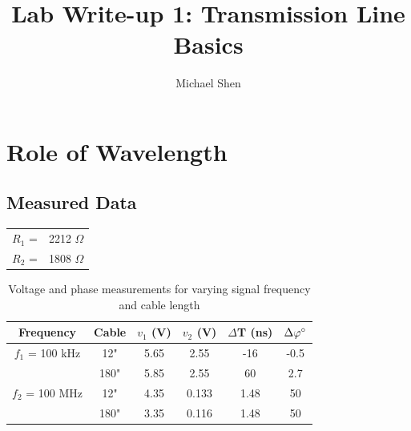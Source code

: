 \documentclass{article}
\begin{document}
\title{Lab Write-up 1: Transmission Line Basics}
\author{Michael Shen}
\maketitle

\section{Role of Wavelength}
\subsection{Measured Data}
\begin{table}[h]
	\begin{tabular}{rl}
	$R_{1}$ =  & 2212 $\Omega$  \\
	$R_{2}$ =  & 1808 $\Omega$      
	\end{tabular}
\end{table}

\begin{table}[H]
\centering
	\begin{tabular}{|c|c|c|c|c|c|}
	\hline
	\textbf{Frequency} & \textbf{Cable} & $v_1$ (V) & $v_2$ (V) & $\Delta$T (ns) & $\Delta\varphi\degree$ \\ \hline
	$f_{1}$ = 100 kHz  & 12"                & 5.65   & 2.55   & -16     & -0.5      \\ \hline
	                   & 180"               & 5.85   & 2.55   & 60      & 2.7       \\ \hline
	$f_{2}$ = 100 MHz  & 12"                & 4.35   & 0.133  & 1.48    & 50        \\ \hline
	                   & 180"               & 3.35   & 0.116  & 1.48    & 50        \\ \hline
	\end{tabular}
	\caption{Voltage and phase measurements for varying signal frequency and cable length}
	\label{Data 1}
\end{table}
\end{document}
